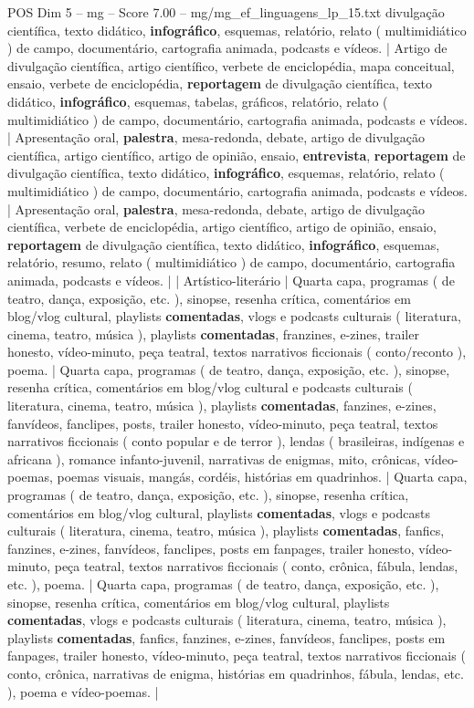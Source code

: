 \begin{textsample}{POS Dim 5 – mg – Score 7.00 – mg/mg\_ef\_linguagens\_lp\_15.txt}
divulgação científica, texto didático, \textbf{infográfico}, esquemas, relatório, relato ( multimidiático ) de campo, documentário, cartografia animada, podcasts e vídeos. | Artigo de divulgação científica, artigo científico, verbete de enciclopédia, mapa conceitual, ensaio, verbete de enciclopédia, \textbf{reportagem} de divulgação científica, texto didático, \textbf{infográfico}, esquemas, tabelas, gráficos, relatório, relato ( multimidiático ) de campo, documentário, cartografia animada, podcasts e vídeos. | Apresentação oral, \textbf{palestra}, mesa-redonda, debate, artigo de divulgação científica, artigo científico, artigo de opinião, ensaio, \textbf{entrevista}, \textbf{reportagem} de divulgação científica, texto didático, \textbf{infográfico}, esquemas, relatório, relato ( multimidiático ) de campo, documentário, cartografia animada, podcasts e vídeos. | Apresentação oral, \textbf{palestra}, mesa-redonda, debate, artigo de divulgação científica, verbete de enciclopédia, artigo científico, artigo de opinião, ensaio, \textbf{reportagem} de divulgação científica, texto didático, \textbf{infográfico}, esquemas, relatório, resumo, relato ( multimidiático ) de campo, documentário, cartografia animada, podcasts e vídeos. | | Artístico-literário | Quarta capa, programas ( de teatro, dança, exposição, etc. ), sinopse, resenha crítica, comentários em blog/vlog cultural, playlists \textbf{comentadas}, vlogs e podcasts culturais ( literatura, cinema, teatro, música ), playlists \textbf{comentadas}, franzines, e-zines, trailer honesto, vídeo-minuto, peça teatral, textos narrativos ficcionais ( conto/reconto ), poema. | Quarta capa, programas ( de teatro, dança, exposição, etc. ), sinopse, resenha crítica, comentários em blog/vlog cultural e podcasts culturais ( literatura, cinema, teatro, música ), playlists \textbf{comentadas}, fanzines, e-zines, fanvídeos, fanclipes, posts, trailer honesto, vídeo-minuto, peça teatral, textos narrativos ficcionais ( conto popular e de terror ), lendas ( brasileiras, indígenas e africana ), romance infanto-juvenil, narrativas de enigmas, mito, crônicas, vídeo-poemas, poemas visuais, mangás, cordéis, histórias em quadrinhos. | Quarta capa, programas ( de teatro, dança, exposição, etc. ), sinopse, resenha crítica, comentários em blog/vlog cultural, playlists \textbf{comentadas}, vlogs e podcasts culturais ( literatura, cinema, teatro, música ), playlists \textbf{comentadas}, fanfics, fanzines, e-zines, fanvídeos, fanclipes, posts em fanpages, trailer honesto, vídeo-minuto, peça teatral, textos narrativos ficcionais ( conto, crônica, fábula, lendas, etc. ), poema. | Quarta capa, programas ( de teatro, dança, exposição, etc. ), sinopse, resenha crítica, comentários em blog/vlog cultural, playlists \textbf{comentadas}, vlogs e podcasts culturais ( literatura, cinema, teatro, música ), playlists \textbf{comentadas}, fanfics, fanzines, e-zines, fanvídeos, fanclipes, posts em fanpages, trailer honesto, vídeo-minuto, peça teatral, textos narrativos ficcionais ( conto, crônica, narrativas de enigma, histórias em quadrinhos, fábula, lendas, etc. ), poema e vídeo-poemas. |

\end{textsample}
